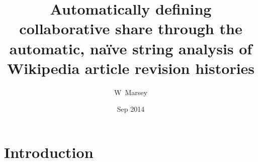 \documentclass[t]{beamer}
\begin{document}
\title[Analysis of Wikipedia hitories] %
{Automatically defining collaborative share through
    the automatic, na\"ive string analysis of Wikipedia article
    revision histories}
\author %
{W~Marsey}
\date %
{Sep 2014}
\subject{Computing Science}

\frame{\titlepage}

\section{Introduction}


  
\end{document}
